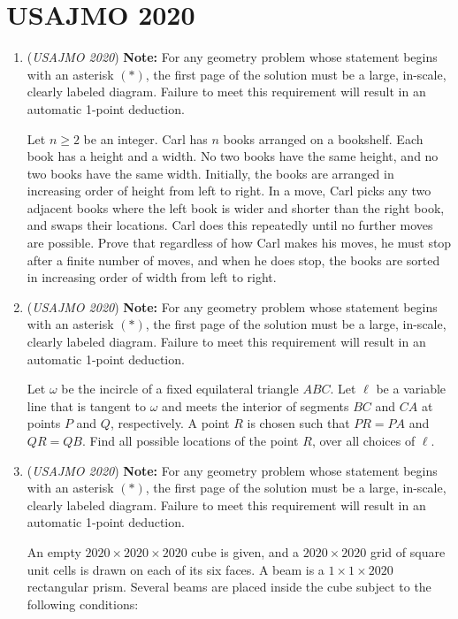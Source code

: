 \section{USAJMO 2020}
        \begin{enumerate}
        	\item (\textit{USAJMO 2020}) \textbf{Note:} For any geometry problem whose statement begins with an asterisk $(*)$, the first page of the solution must be a large, in-scale, clearly labeled diagram. Failure to meet this requirement will result in an automatic 1-point deduction.


 Let $n \geq 2$ be an integer. Carl has $n$ books arranged on a bookshelf. Each book has a height and a width. No two books have the same height, and no two books have the same width. Initially, the books are arranged in increasing order of height from left to right. In a move, Carl picks any two adjacent books where the left book is wider and shorter than the right book, and swaps their locations. Carl does this repeatedly until no further moves are possible.  Prove that regardless of how Carl makes his moves, he must stop after a finite number of moves, and when he does stop, the books are sorted in increasing order of width from left to right.


 

	\item (\textit{USAJMO 2020}) \textbf{Note:} For any geometry problem whose statement begins with an asterisk $(*)$, the first page of the solution must be a large, in-scale, clearly labeled diagram. Failure to meet this requirement will result in an automatic 1-point deduction.


 Let $\omega$ be the incircle of a fixed equilateral triangle $ABC$. Let $\ell$ be a variable line that is tangent to $\omega$ and meets the interior of segments $BC$ and $CA$ at points $P$ and $Q$, respectively. A point $R$ is chosen such that $PR = PA$ and $QR = QB$. Find all possible locations of the point $R$, over all choices of $\ell$.


 

	\item (\textit{USAJMO 2020}) \textbf{Note:} For any geometry problem whose statement begins with an asterisk $(*)$, the first page of the solution must be a large, in-scale, clearly labeled diagram. Failure to meet this requirement will result in an automatic 1-point deduction.


 An empty $2020 \times 2020 \times 2020$ cube is given, and a $2020 \times 2020$ grid of square unit cells is drawn  on each of its six faces. A beam is a $1 \times 1 \times 2020$ rectangular prism. Several beams are placed inside the cube subject to the following conditions:



\end{enumerate}
